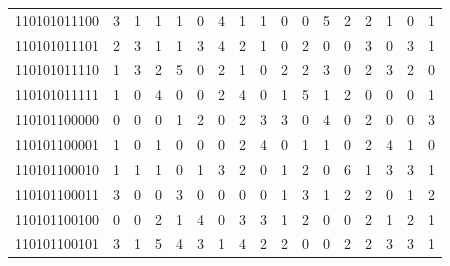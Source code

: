 \documentclass[10pt,a4paper]{article}
\begin{document}
\begin{longtable}{ |c|c|c|c|c|c|c|c|c|c|c|c|c|c|c|c|c| }
    110101011100              & 3                            & 1                                & 1                            & 1                              & 0   & 4   & 1   & 1   & 0   & 0   & 5   & 2   & 2   & 1   & 0   & 1   \\
    110101011101              & 2                            & 3                                & 1                            & 1                              & 3   & 4   & 2   & 1   & 0   & 2   & 0   & 0   & 3   & 0   & 3   & 1   \\
    110101011110              & 1                            & 3                                & 2                            & 5                              & 0   & 2   & 1   & 0   & 2   & 2   & 3   & 0   & 2   & 3   & 2   & 0   \\
    110101011111              & 1                            & 0                                & 4                            & 0                              & 0   & 2   & 4   & 0   & 1   & 5   & 1   & 2   & 0   & 0   & 0   & 1   \\
    110101100000              & 0                            & 0                                & 0                            & 1                              & 2   & 0   & 2   & 3   & 3   & 0   & 4   & 0   & 2   & 0   & 0   & 3   \\
    110101100001              & 1                            & 0                                & 1                            & 0                              & 0   & 0   & 2   & 4   & 0   & 1   & 1   & 0   & 2   & 4   & 1   & 0   \\
    110101100010              & 1                            & 1                                & 1                            & 0                              & 1   & 3   & 2   & 0   & 1   & 2   & 0   & 6   & 1   & 3   & 3   & 1   \\
    110101100011              & 3                            & 0                                & 0                            & 3                              & 0   & 0   & 0   & 0   & 1   & 3   & 1   & 2   & 2   & 0   & 1   & 2   \\
    110101100100              & 0                            & 0                                & 2                            & 1                              & 4   & 0   & 3   & 3   & 1   & 2   & 0   & 0   & 2   & 1   & 2   & 1   \\
    110101100101              & 3                            & 1                                & 5                            & 4                              & 3   & 1   & 4   & 2   & 2   & 0   & 0   & 2   & 2   & 3   & 3   & 1   \\

\end{longtable}
\end{document}
